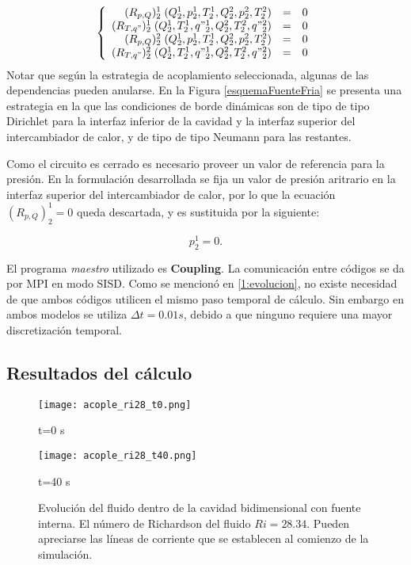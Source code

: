 \begin{equation}
\left\{ \begin{array}{rcl}
(R_{p,Q})_{2}^{1}  \;(Q_2^1, p_2^1, T_2^1, Q_2^2, p_2^2, T_2^2) &=& 0 \\
(R_{T,q"})_{2}^{1} \;(Q_2^1, T_2^1, q"_2^1, Q_2^2, T_2^2, q"_2^2) &=& 0 \\
(R_{p,Q})_{2}^{2}  \;(Q_2^1, p_2^1, T_2^1, Q_2^2, p_2^2, T_2^2) &=& 0 \\
(R_{T,q"})_{2}^{2} \;(Q_2^1, T_2^1, q"_2^1, Q_2^2, T_2^2, q"_2^2) &=& 0
\end{array}
\right.
\label{residuos-2}
\end{equation}
Notar que según la estrategia de acoplamiento seleccionada, algunas de las dependencias pueden anularse.
En la Figura \ref{esquemaFuenteFria} se presenta una estrategia en la que las condiciones de borde dinámicas son 
de tipo de tipo Dirichlet para la interfaz inferior de la cavidad y la interfaz superior del intercambiador de calor, 
y de tipo de tipo Neumann para las restantes.

Como el circuito es cerrado es necesario proveer un valor de referencia para la presión.
En la formulación desarrollada se fija un valor de presión aritrario en la interfaz superior del intercambiador de calor,
por lo que la ecuación $(R_{p,Q})_{2}^{1}=0$ queda descartada, y es sustituida por la siguiente:

\begin{equation*}
p_2^1 = 0.
\end{equation*}

El programa \textit{maestro} utilizado es \textbf{Coupling}.
La comunicación entre códigos se da por MPI en modo SISD.
Como se mencionó en \ref{1:evolucion}, no existe necesidad de que ambos códigos utilicen el mismo paso temporal de cálculo.
Sin embargo en ambos modelos se utiliza $\Delta t=0.01s$, debido a que ninguno requiere una mayor discretización temporal.

\subsection*{Resultados del cálculo}

\begin{figure}[ht]
	\begin{minipage}{0.5\linewidth}
		\centering
		\texttt{[image: acople\_ri28\_t0.png]}
		\caption[]{t=0 s}
		\label{asd}	
	\end{minipage}
	\begin{minipage}{0.5\linewidth}
		\centering
		\texttt{[image: acople\_ri28\_t40.png]}
		\caption[]{t=40 s}
		\label{asd}	
	\end{minipage}
	\caption[Evolución en el transitorio inicial del fluido dentro de la cavidad bidimensional con fuente interna]
  {Evolución del fluido dentro de la cavidad bidimensional con fuente interna.
	El número de Richardson del fluido $Ri=28.34$.
	Pueden apreciarse las líneas de corriente que se establecen al comienzo de la simulación.} 
	\label{acople_ri28_1}
\end{figure}


